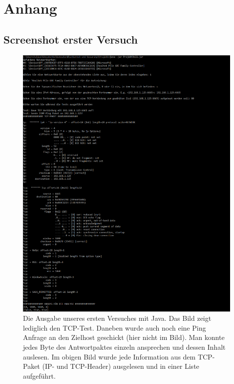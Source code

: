 \documentclass{article} %
\begin{document}
\appendix
\section{Anhang}
\subsection{Screenshot erster Versuch}
\begin{figure}[!htb]
\begin{center}
\includegraphics[height=0.5\paperheight]{data/grafik7.png}
\captionsetup{singlelinecheck=off}
\caption[Titel]{
Die Ausgabe unseres ersten Versuches mit Java. Das Bild zeigt lediglich den TCP-Test. Daneben wurde auch noch eine Ping Anfrage an den Zielhost geschickt (hier nicht im Bild). Man konnte jedes Byte des Antwortpaktes einzeln ansprechen und dessen Inhalt auslesen. Im obigen Bild wurde jede Information aus dem TCP-Paket (IP- und TCP-Header) ausgelesen und in einer Liste aufgeführt.
}%
\label{Abb.54}
\end{center}
\end{figure}
\newpage
\end{document}
